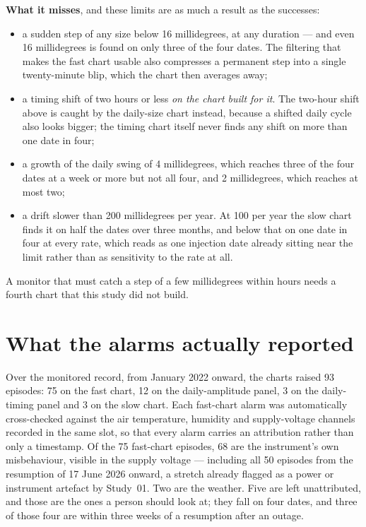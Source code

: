 \documentclass[11pt,a4paper]{article}
\begin{document}
\textbf{What it misses}, and these limits are as much a result as the successes:
\begin{itemize}
    \item a sudden step of any size below 16 millidegrees, at any duration --- and
    even 16 millidegrees is found on only three of the four dates. The filtering
    that makes the fast chart usable also compresses a permanent step into a
    single twenty-minute blip, which the chart then averages away;
    \item a timing shift of two hours or less \emph{on the chart built for it}.
    The two-hour shift above is caught by the daily-size chart instead, because a
    shifted daily cycle also looks bigger; the timing chart itself never finds any
    shift on more than one date in four;
    \item a growth of the daily swing of 4 millidegrees, which reaches three of
    the four dates at a week or more but not all four, and 2 millidegrees, which
    reaches at most two;
    \item a drift slower than 200 millidegrees per year. At 100 per year the slow
    chart finds it on half the dates over three months, and below that on one date
    in four at every rate, which reads as one injection date already sitting near
    the limit rather than as sensitivity to the rate at all.
\end{itemize}

A monitor that must catch a step of a few millidegrees within hours needs a
fourth chart that this study did not build.

\section{What the alarms actually reported}

Over the monitored record, from January 2022 onward, the charts raised 93
episodes: 75 on the fast chart, 12 on the daily-amplitude panel, 3 on the
daily-timing panel and 3 on the slow chart. Each fast-chart alarm was
automatically cross-checked against the air temperature, humidity and
supply-voltage channels recorded in the same slot, so that every alarm carries an
attribution rather than only a timestamp. Of the 75 fast-chart episodes, 68 are
the instrument's own misbehaviour, visible in the supply voltage --- including
all 50 episodes from the resumption of 17 June 2026 onward, a stretch already
flagged as a power or instrument artefact by Study~01. Two are the weather. Five
are left unattributed, and those are the ones a person should look at; they fall
on four dates, and three of those four are within three weeks of a resumption
after an outage.
\end{document}
